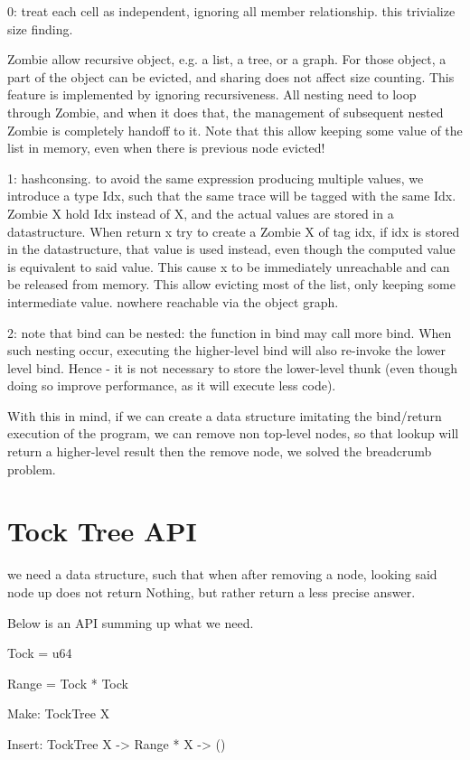 \documentclass[acmsmall]{acmart}
\begin{document}
	0: treat each cell as independent, ignoring all member relationship.
	this trivialize size finding.
	
	Zombie allow recursive object, e.g. a list, a tree, or a graph.
	For those object, a part of the object can be evicted, and sharing does not affect size counting.
	This feature is implemented by ignoring recursiveness. All nesting need to loop through Zombie, and when it does that, the management of subsequent nested Zombie is completely handoff to it.
	Note that this allow keeping some value of the list in memory, even when there is previous node evicted!
	
	1: hashconsing. to avoid the same expression producing multiple values, we introduce a type Idx, such that the same trace will be tagged with the same Idx.
	Zombie X hold Idx instead of X, and the actual values are stored in a datastructure.
	When return x try to create a Zombie X of tag idx, if idx is stored in the datastructure, that value is used instead, even though the computed value is equivalent to said value. This cause x to be immediately unreachable and can be released from memory. This allow evicting most of the list, only keeping some intermediate value. nowhere reachable via the object graph.
	
	2: note that bind can be nested: the function in bind may call more bind. When such nesting occur, executing the higher-level bind will also re-invoke the lower level bind. Hence - it is not necessary to store the lower-level thunk (even though doing so improve performance, as it will execute less code).
	
	With this in mind, if we can create a data structure imitating the bind/return execution of the program, we can remove non top-level nodes, so that lookup will return a higher-level result then the remove node, we solved the breadcrumb problem.
	
	\section{Tock Tree API}
	we need a data structure, such that when after removing a node, looking said node up does not return Nothing, but rather return a less precise answer.
	
	Below is an API summing up what we need.

	Tock = u64

	Range = Tock * Tock

	Make: TockTree X

	Insert: TockTree X -> Range * X -> ()
\end{document}
